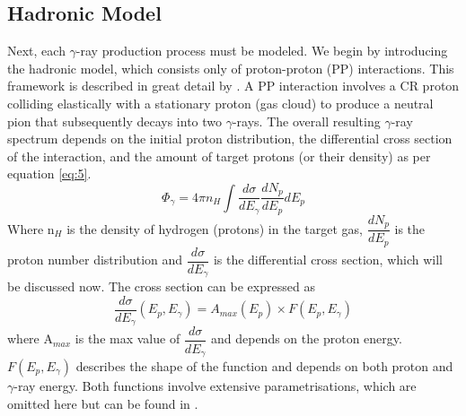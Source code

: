 \documentclass[12pt,a4paper]{article}
\begin{document}
\subsection{Hadronic Model}
Next, each $\gamma$-ray production process must be modeled. We begin by introducing the hadronic model, which consists only of proton-proton (PP) interactions. This framework is described in great detail by \cite{2014PhRvD..90l3014K}. A PP interaction involves a CR proton colliding elastically with a stationary proton (gas cloud) to produce a neutral pion that subsequently decays into two $\gamma$-rays. The overall resulting $\gamma$-ray spectrum depends on the initial proton distribution, the differential cross section of the interaction, and the amount of target protons (or their density) as per equation \ref{eq:5}.
\begin{equation} \label{eq:5}
\Phi_{\gamma} = 4 \pi n_H \int \dfrac{d\sigma}{dE_\gamma} \dfrac{dN_p}{dE_p} dE_p
\end{equation}
Where n$_H$ is the density of hydrogen (protons) in the target gas, $\dfrac{dN_p}{dE_p}$ is the proton number distribution and   $\dfrac{d\sigma}{dE_\gamma}$ is the differential cross section, which will be discussed now. The cross section can be expressed as
\begin{equation} \label{eq:6}
\dfrac{d\sigma}{dE_\gamma} (E_p, E_{\gamma}) = A_{max}(E_p) \times F(E_p, E_{\gamma})
\end{equation}
where A$_{max}$ is the max value of $\dfrac{d\sigma}{dE_\gamma}$ and depends on the proton energy. $F(E_p, E_{\gamma})$ describes the shape of the function and depends on both proton and $\gamma$-ray energy. Both functions involve extensive parametrisations, which are omitted here but can be found in \cite{2014PhRvD..90l3014K}.
\end{document}
